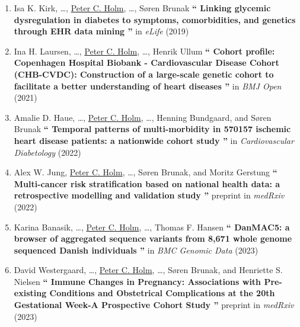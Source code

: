 \begin{enumerate}

    \item %
    Isa K. Kirk, \ldots, 
    \underline{Peter C. Holm},
    \ldots, Søren Brunak
    \textbf{\enquote{%
        Linking glycemic dysregulation in diabetes to symptoms, 
        comorbidities, and genetics through EHR data mining
    }}
    in \textit{eLife} (2019)

    \item %
    Ina H. Laursen, \ldots, 
    \underline{Peter C. Holm},
    \ldots, Henrik Ullum
    \textbf{\enquote{%
        Cohort profile: Copenhagen Hospital Biobank - Cardiovascular Disease Cohort
        (CHB-CVDC): Construction of a large-scale genetic cohort to facilitate a
        better understanding of heart diseases
    }}
    in \textit{BMJ Open} (2021)

    \item %
    Amalie D. Haue, \ldots, 
    \underline{Peter C. Holm},
    \ldots, Henning Bundgaard, and Søren Brunak
    \textbf{\enquote{%
        Temporal patterns of multi-morbidity in 
        570157 ischemic heart disease patients: 
        a nationwide cohort study
    }}
    in \textit{Cardiovascular Diabetology} (2022)

    \item %
    Alex W. Jung, 
    \underline{Peter C. Holm}, \ldots, 
    Søren Brunak, and 
    Moritz Gerstung
    \textbf{\enquote{%
        Multi-cancer risk stratification based on national health data: a
        retrospective modelling and validation study
    }}
    preprint in \textit{medRxiv} (2022)

    \item %
    Karina Banasik, \ldots, 
    \underline{Peter C. Holm}, \ldots, 
    Thomas F. Hansen
    \textbf{\enquote{%
        DanMAC5: a browser of aggregated sequence variants from 8,671 whole genome
        sequenced Danish individuals
    }}
    in \textit{BMC Genomic Data} (2023)

    \item %
    David Westergaard, \ldots, 
    \underline{Peter C. Holm}, \ldots, 
    Søren Brunak, and 
    Henriette S. Nielsen
    \textbf{\enquote{%
        Immune Changes in Pregnancy: Associations with Pre-existing Conditions and
        Obstetrical Complications at the 20th Gestational Week-A Prospective Cohort
        Study
    }}
    preprint in \textit{medRxiv} (2023)
\end{enumerate}




